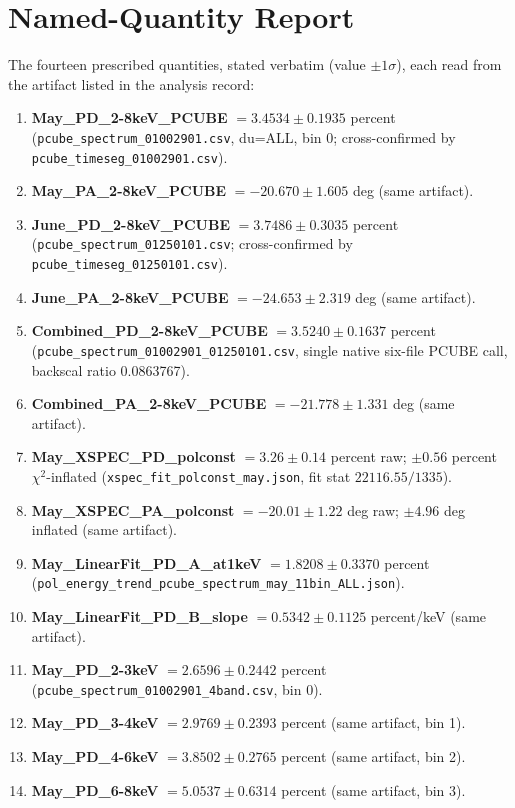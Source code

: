 \section{Named-Quantity Report}
The fourteen prescribed quantities, stated verbatim (value $\pm 1\sigma$), each read from the artifact listed in the analysis record:
\begin{enumerate}
\item \textbf{May\_PD\_2-8keV\_PCUBE} $= 3.4534 \pm 0.1935$ percent (\texttt{pcube\_spectrum\_01002901.csv}, du=ALL, bin 0; cross-confirmed by \texttt{pcube\_timeseg\_01002901.csv}).
\item \textbf{May\_PA\_2-8keV\_PCUBE} $= -20.670 \pm 1.605$ deg (same artifact).
\item \textbf{June\_PD\_2-8keV\_PCUBE} $= 3.7486 \pm 0.3035$ percent (\texttt{pcube\_spectrum\_01250101.csv}; cross-confirmed by \texttt{pcube\_timeseg\_01250101.csv}).
\item \textbf{June\_PA\_2-8keV\_PCUBE} $= -24.653 \pm 2.319$ deg (same artifact).
\item \textbf{Combined\_PD\_2-8keV\_PCUBE} $= 3.5240 \pm 0.1637$ percent (\texttt{pcube\_spectrum\_01002901\_01250101.csv}, single native six-file PCUBE call, backscal ratio 0.0863767).
\item \textbf{Combined\_PA\_2-8keV\_PCUBE} $= -21.778 \pm 1.331$ deg (same artifact).
\item \textbf{May\_XSPEC\_PD\_polconst} $= 3.26 \pm 0.14$ percent raw; $\pm 0.56$ percent $\chi^2$-inflated (\texttt{xspec\_fit\_polconst\_may.json}, fit stat $22116.55/1335$).
\item \textbf{May\_XSPEC\_PA\_polconst} $= -20.01 \pm 1.22$ deg raw; $\pm 4.96$ deg inflated (same artifact).
\item \textbf{May\_LinearFit\_PD\_A\_at1keV} $= 1.8208 \pm 0.3370$ percent (\texttt{pol\_energy\_trend\_pcube\_spectrum\_may\_11bin\_ALL.json}).
\item \textbf{May\_LinearFit\_PD\_B\_slope} $= 0.5342 \pm 0.1125$ percent/keV (same artifact).
\item \textbf{May\_PD\_2-3keV} $= 2.6596 \pm 0.2442$ percent (\texttt{pcube\_spectrum\_01002901\_4band.csv}, bin 0).
\item \textbf{May\_PD\_3-4keV} $= 2.9769 \pm 0.2393$ percent (same artifact, bin 1).
\item \textbf{May\_PD\_4-6keV} $= 3.8502 \pm 0.2765$ percent (same artifact, bin 2).
\item \textbf{May\_PD\_6-8keV} $= 5.0537 \pm 0.6314$ percent (same artifact, bin 3).
\end{enumerate}
